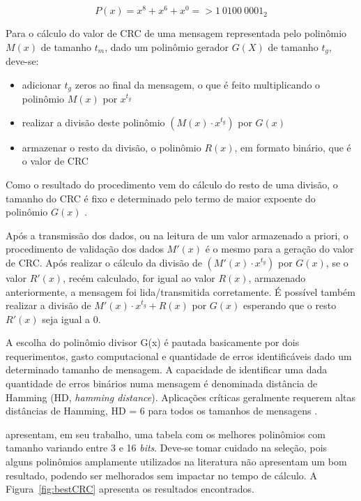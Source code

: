 \documentclass[12pt,openright,oneside,a4paper,brazil]{abntex2}
\begin{document}
\begin{equation}
P(x) = x^8 + x^6 + x^0 => 1~0100~0001_2
\end{equation}

Para o cálculo do valor de CRC de uma mensagem representada pelo polinômio $M(x)$ de tamanho $t_m$, dado um polinômio gerador $G(X)$ de tamanho $t_g$, deve-se:
\begin{itemize}
	\item adicionar $t_g$ zeros ao final da mensagem, o que é feito multiplicando o polinômio $M(x)$ por $x^{t_g}$
	\item realizar a divisão deste polinômio $(M(x)\cdot x^{t_g})$ por $G(x)$
	\item armazenar o resto da divisão, o polinômio $R(x)$, em formato binário, que é o valor de CRC
\end{itemize}

Como o resultado do procedimento vem do cálculo do resto de uma divisão, o tamanho do CRC é fixo e determinado pelo termo de maior expoente do polinômio $G(x)$ \cite{kurose2012computer}.

Após a transmissão dos dados, ou na leitura de um valor armazenado a priori, o procedimento de validação dos dados $M'(x)$  é o mesmo para a geração do valor de CRC. Após realizar o cálculo da divisão de $(M'(x)\cdot x^{t_g})$ por $G(x)$, se o valor $R'(x)$, recém calculado, for igual ao valor $R(x)$, armazenado anteriormente, a mensagem foi lida/transmitida corretamente. É possível também realizar a divisão de $M'(x)\cdot x^{t_g} + R(x)$ por $G(x)$ esperando que o resto $R'(x)$ seja igual a 0. 

A escolha do polinômio divisor G(x) é pautada basicamente por dois requerimentos, gasto computacional e quantidade de erros identificáveis dado um determinado tamanho de mensagem. A capacidade de identificar uma dada quantidade de erros binários numa mensagem é denominada distância de Hamming (HD, \textit{hamming distance}). Aplicações críticas geralmente requerem altas distâncias de Hamming, HD = 6 para todos os tamanhos de mensagens \cite{ray2006efficient}.

 apresentam, em seu trabalho, uma tabela com os melhores polinômios com tamanho variando entre 3 e 16 \textit{bits}. Deve-se tomar cuidado na seleção, pois alguns polinômios amplamente utilizados na literatura não apresentam um bom resultado, podendo ser melhorados sem impactar no tempo de cálculo. A Figura~\ref{fig:bestCRC} apresenta os resultados encontrados.
\end{document}
